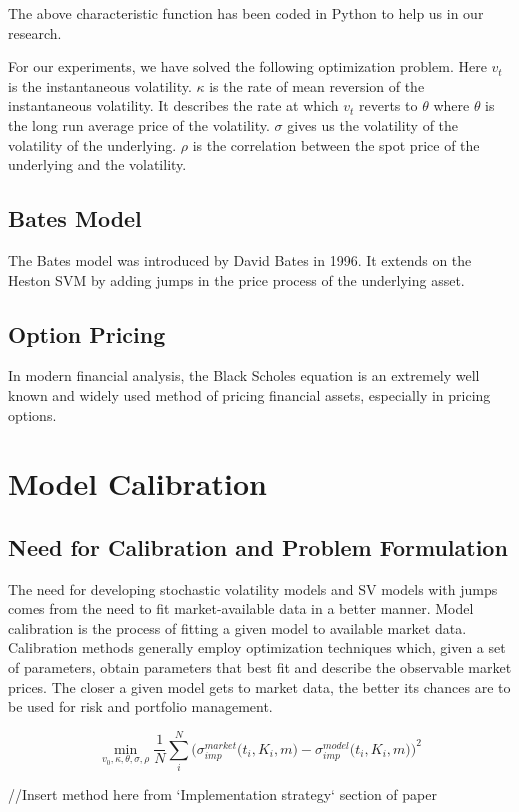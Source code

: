 \documentclass{article}
\begin{document}
The above characteristic function has been coded in Python to help us in our research.

For our experiments, we have solved the following optimization problem. Here $v_t$ is the instantaneous volatility. $\kappa$ is the rate of mean reversion of the instantaneous volatility. It describes the rate at which $v_t$ reverts to $\theta$ where $\theta$ is the long run average price of the volatility. $\sigma$ gives us the volatility of the volatility of the underlying. $\rho$ is the correlation between the spot price of the underlying and the volatility. 
\subsection{Bates Model}
The Bates model was introduced by David Bates in 1996. It extends on the Heston SVM by  adding jumps in the price process of the underlying asset. 
\subsection{Option Pricing}
In modern financial analysis, the Black Scholes equation is an extremely well known and widely used method of pricing financial assets, especially in pricing options. 
\section{Model Calibration}
\subsection{Need for Calibration and Problem Formulation}
The need for developing stochastic volatility models and SV models with jumps comes from the need to fit market-available data in a better manner. Model calibration is the process of fitting a given model to available market data. Calibration methods generally employ optimization techniques which, given a set of parameters, obtain parameters that best fit and describe the observable market prices. The closer a given model gets to market data, the better its chances are to be used for risk and portfolio management. 


\begin{equation}
    \min_{v_{0},\kappa,\theta,\sigma,\rho}\frac{1}{N}\sum_{i}^{N}\big(\sigma_{imp}^{market}\big(t_{i},K_{i},m\big) - \sigma_{imp}^{model}\big(t_{i},K_{i},m\big)\big)^2
\end{equation}

//Insert method here from `Implementation strategy` section of paper
\end{document}
